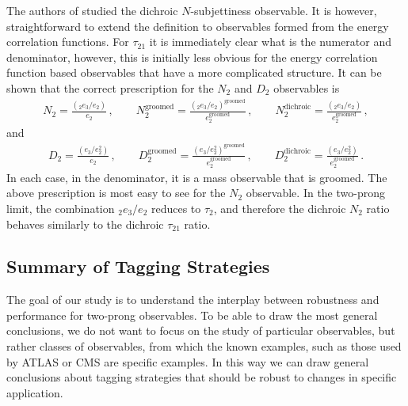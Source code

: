 \documentclass[11pt,letterpaper]{article}
\newcommand{\groomed}{\text{groomed}}
\newcommand{\ecfnobeta}[1]{e_{#1}}
\newcommand{\ecfvarnobeta}[2]{{_{#1}e_{#2}}}
\begin{document}
The authors of \cite{Salam:2016yht} studied the dichroic $N$-subjettiness observable. It is however, straightforward to extend the definition to observables formed from the energy correlation functions. For $\tau_{21}$ it is immediately clear what is the numerator and denominator, however, this is initially less obvious for the energy correlation function based observables that have a more complicated structure. It can be shown that the correct prescription for the $N_2$ and $D_2$ observables is
\begin{align}
N_2= \frac{\left( \ecfvarnobeta{2}{3} / \ecfnobeta{2} \right) }{\ecfnobeta{2}}\,, \qquad  N_2^{\text{groomed}}= \frac{\left( \ecfvarnobeta{2}{3} / \ecfnobeta{2} \right)^\groomed }{\ecfnobeta{2}^\groomed}\,, \qquad  N_2^{\text{dichroic}}= \frac{\left( \ecfvarnobeta{2}{3} / \ecfnobeta{2} \right) }{\ecfnobeta{2}^\groomed}\,, 
\end{align}
and
\begin{align}
D_2=\frac{\left( \ecfnobeta{3} / \ecfnobeta{2}^2 \right)}{ \ecfnobeta{2}}\,, \qquad D_2^{\text{groomed}}=\frac{\left( \ecfnobeta{3} / \ecfnobeta{2}^2 \right)^\groomed}{ \ecfnobeta{2}^\groomed}\,, \qquad D_2^{\text{dichroic}}=\frac{\left( \ecfnobeta{3} / \ecfnobeta{2}^2 \right)}{ \ecfnobeta{2}^\groomed}\,.
\end{align}
In each case, in the denominator, it is a mass observable that is groomed. The above prescription is most easy to see for the $N_2$ observable. In the two-prong limit, the combination $ \ecfvarnobeta{2}{3} / \ecfnobeta{2} $ reduces to $\tau_2$, and therefore the dichroic $N_2$ ratio behaves similarly to the dichroic $\tau_{21}$ ratio.

\subsection{Summary of Tagging Strategies}\label{sec:dichroic_sum}

The goal of our study is to understand the interplay between robustness and performance for two-prong observables. To be able to draw the most general conclusions, we do not want to focus on the study of particular observables, but rather classes of observables, from which the known examples, such as those used by ATLAS or CMS are specific examples. In this way we can draw general conclusions about tagging strategies that should be robust to changes in specific application.
\end{document}
